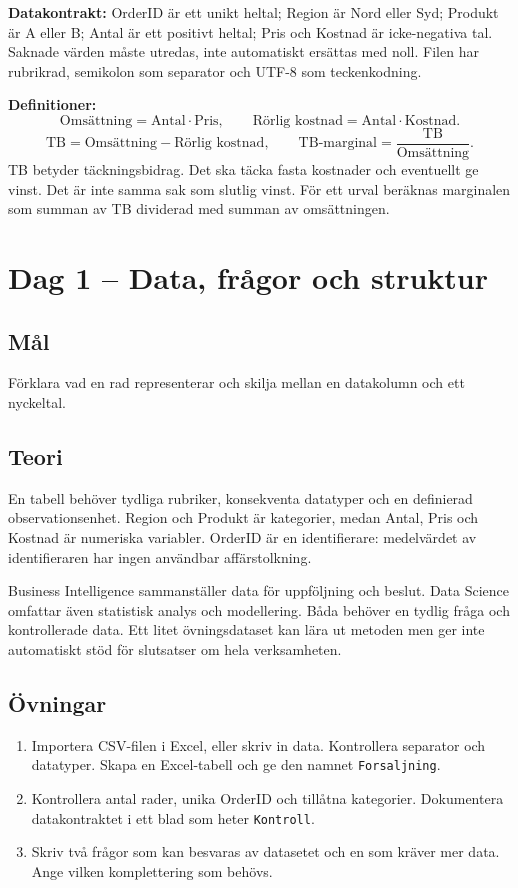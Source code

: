 \documentclass[11pt,a4paper]{article}
\newcommand{\dag}[2]{\clearpage\section{Dag #1 -- #2}}
\begin{document}
\textbf{Datakontrakt:} OrderID är ett unikt heltal; Region är Nord eller Syd; Produkt är A eller B; Antal är ett positivt heltal; Pris och Kostnad är icke-negativa tal. Saknade värden måste utredas, inte automatiskt ersättas med noll. Filen har rubrikrad, semikolon som separator och UTF-8 som teckenkodning.

\textbf{Definitioner:}
\[
\text{Omsättning}=\text{Antal}\cdot\text{Pris},\qquad
\text{Rörlig kostnad}=\text{Antal}\cdot\text{Kostnad}.
\]
\[
\text{TB}=\text{Omsättning}-\text{Rörlig kostnad},\qquad
\text{TB-marginal}=\frac{\text{TB}}{\text{Omsättning}}.
\]
TB betyder täckningsbidrag. Det ska täcka fasta kostnader och eventuellt ge vinst. Det är inte samma sak som slutlig vinst. För ett urval beräknas marginalen som summan av TB dividerad med summan av omsättningen.

\dag{1}{Data, frågor och struktur}
\subsection*{Mål}
Förklara vad en rad representerar och skilja mellan en datakolumn och ett nyckeltal.
\subsection*{Teori}
En tabell behöver tydliga rubriker, konsekventa datatyper och en definierad observationsenhet. Region och Produkt är kategorier, medan Antal, Pris och Kostnad är numeriska variabler. OrderID är en identifierare: medelvärdet av identifieraren har ingen användbar affärstolkning.

Business Intelligence sammanställer data för uppföljning och beslut. Data Science omfattar även statistisk analys och modellering. Båda behöver en tydlig fråga och kontrollerade data. Ett litet övningsdataset kan lära ut metoden men ger inte automatiskt stöd för slutsatser om hela verksamheten.
\subsection*{Övningar}
\begin{enumerate}
\item Importera CSV-filen i Excel, eller skriv in data. Kontrollera separator och datatyper. Skapa en Excel-tabell och ge den namnet \texttt{Forsaljning}.
\item Kontrollera antal rader, unika OrderID och tillåtna kategorier. Dokumentera datakontraktet i ett blad som heter \texttt{Kontroll}.
\item Skriv två frågor som kan besvaras av datasetet och en som kräver mer data. Ange vilken komplettering som behövs.
\end{enumerate}
\end{document}
